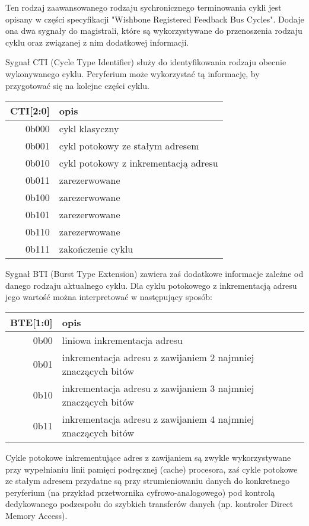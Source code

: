 Ten rodzaj zaawansowanego rodzaju sychronicznego terminowania cykli jest opisany w części specyfikacji "Wishbone Registered Feedback Bus Cycles". Dodaje ona dwa sygnały do magistrali, które są wykorzystywane do przenoszenia rodzaju cyklu oraz związanej z nim dodatkowej informacji.

Sygnał CTI (Cycle Type Identifier) służy do identyfikowania rodzaju obecnie wykonywanego cyklu. Peryferium może wykorzystać tą informację, by przygotować się na kolejne części cyklu.
\begin{center}
\begin{tabular}{ r|l }
 CTI[2:0] & opis \\ 
 \hline
 0b000 & cykl klasyczny \\
 0b001 & cykl potokowy ze stałym adresem \\
 0b010 & cykl potokowy z inkrementacją adresu \\
 0b011 & zarezerwowane \\
 0b100 & zarezerwowane \\
 0b101 & zarezerwowane \\
 0b110 & zarezerwowane \\
 0b111 & zakończenie cyklu \\
 \hline
\end{tabular}
\end{center}

Sygnał BTI (Burst Type Extension) zawiera zaś dodatkowe informacje zależne od danego rodzaju aktualnego cyklu.
Dla cyklu potokowego z inkrementacją adresu jego wartość można interpretować w następujący sposób:

\begin{center}
\begin{tabular}{ r|l }
 BTE[1:0] & opis \\ 
 \hline
 0b00 & liniowa inkrementacja adresu \\
 0b01 & inkrementacja adresu z zawijaniem 2 najmniej znaczących bitów \\
 0b10 & inkrementacja adresu z zawijaniem 3 najmniej znaczących bitów \\
 0b11 & inkrementacja adresu z zawijaniem 4 najmniej znaczących bitów \\
 \hline
\end{tabular}
\end{center}

Cykle potokowe inkrementujące adres z zawijaniem są zwykle wykorzystywane przy wypełnianiu linii pamięci podręcznej (cache) procesora, zaś cykle potokowe ze stałym adresem przydatne są przy strumieniowaniu danych do konkretnego peryferium (na przykład przetwornika cyfrowo-analogowego) pod kontrolą dedykowanego podzespołu do szybkich transferów danych (np. kontroler Direct Memory Access).

